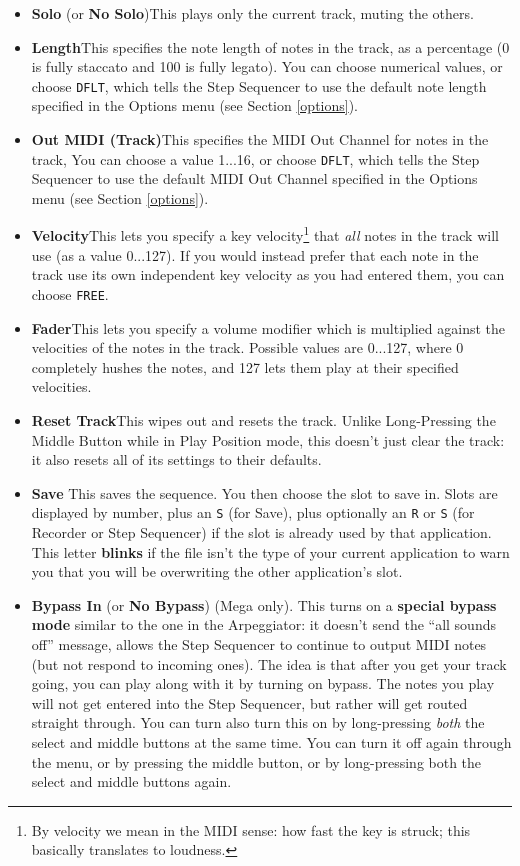 \documentclass{article}
\begin{document}
\begin{itemize}
\item {\bf Solo} (or {\bf No Solo})\quad This plays only the current track, muting the others.
\item {\bf Length}\quad This specifies the note length of notes in the track, as a percentage (0 is fully staccato and 100 is fully legato).   You can choose numerical values, or choose \texttt{DFLT}, which tells the Step Sequencer to use the default note length specified in the Options menu (see Section \ref{options}).
\item {\bf Out MIDI (Track)}\quad This specifies the MIDI Out Channel for notes in the track,    You can choose a value 1...16, or choose \texttt{DFLT}, which tells the Step Sequencer to use the default MIDI Out Channel specified in the Options menu (see Section \ref{options}).
\item {\bf Velocity}\quad This lets you specify a key velocity\footnote{By velocity we mean in the MIDI sense: how fast the key is struck; this basically translates to loudness.} that {\it all} notes in the track will use (as a value 0...127).  If you would instead prefer that each note in the track use its own independent key velocity as you had entered them, you can choose \texttt{FREE}.
\item {\bf Fader}\quad This lets you specify a volume modifier which is multiplied against the velocities of the notes in the track.  Possible values are 0...127, where 0 completely hushes the notes, and 127 lets them play at their specified velocities. 
\item {\bf Reset Track}\quad This wipes out and resets the track.  Unlike Long-Pressing the Middle Button while in Play Position mode, this doesn't just clear the track: it also resets all of its settings to their defaults.
\item {\bf Save} \quad This saves the sequence. You then choose the slot to save in.  Slots are displayed by number, plus an \texttt{S} (for Save), plus optionally an \texttt{R} or \texttt{S} (for Recorder or Step Sequencer) if the slot is already used by that application.  This letter {\bf blinks} if the file isn't the type of your current application to warn you that you will be overwriting the other application's slot.
\item {\bf Bypass In} (or {\bf No Bypass}) (Mega only).  This turns on a {\bf special bypass mode} similar to the one in the Arpeggiator: it doesn't send the ``all sounds off'' message, allows the Step Sequencer to continue to output MIDI notes (but not respond to incoming ones).   The idea is that after you get your track going, you can play along with it by turning on bypass.  The notes you play will not get entered into the Step Sequencer, but rather will get routed straight through.  You can turn also turn this on by long-pressing {\it both} the select and middle buttons at the same time.  You can turn it off again through the menu, or by pressing the middle button, or by long-pressing both the select and middle buttons again.


\end{itemize}
\end{document}
